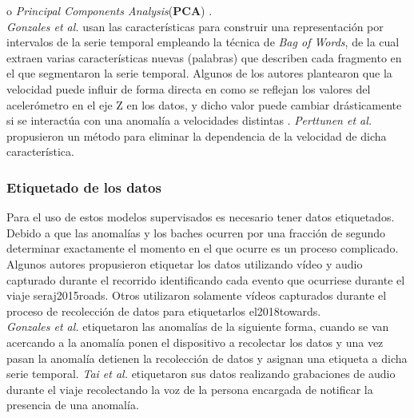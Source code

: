 			o \emph{Principal Components Analysis}(\textbf{PCA}) .\\
			\indent \emph{Gonzales et al.}  usan las características para construir una representación por intervalos de la serie
			temporal empleando la técnica de \emph{Bag of Words}, de la cual extraen varias características nuevas (palabras) que describen cada fragmento
			en el que segmentaron la serie temporal. Algunos de los autores plantearon que la velocidad puede influir de forma directa en como se reflejan
			los valores del acelerómetro en el eje Z en los datos, y dicho valor puede cambiar drásticamente si se interactúa con una anomalía a velocidades
			distintas . \emph{Perttunen et al.} 
			propusieron un método para eliminar la dependencia de la velocidad de dicha característica. 

		\subsubsection{Etiquetado de los datos}
			Para el uso de estos modelos supervisados es necesario tener datos etiquetados. Debido a que las anomalías y los baches ocurren por una 
			fracción de segundo determinar exactamente el momento en el que ocurre es un proceso complicado. Algunos autores propusieron etiquetar
			los datos utilizando vídeo y audio capturado durante el recorrido identificando cada evento que ocurriese durante el viaje \brackcite
			{seraj2015roads}. Otros utilizaron solamente vídeos capturados durante el proceso de recolección de datos para etiquetarlos \brackcite
			{el2018towards}.\\
			\indent \emph{Gonzales et al.}  etiquetaron las anomalías de la siguiente forma, cuando se van acercando a la
			anomalía ponen el dispositivo a recolectar los datos y una vez pasan la anomalía detienen la recolección de datos y asignan una etiqueta
			a dicha serie temporal. \emph{Tai et al.}  etiquetaron sus datos realizando grabaciones de audio durante el
			viaje recolectando la voz de la persona encargada de notificar la presencia de una anomalía.


